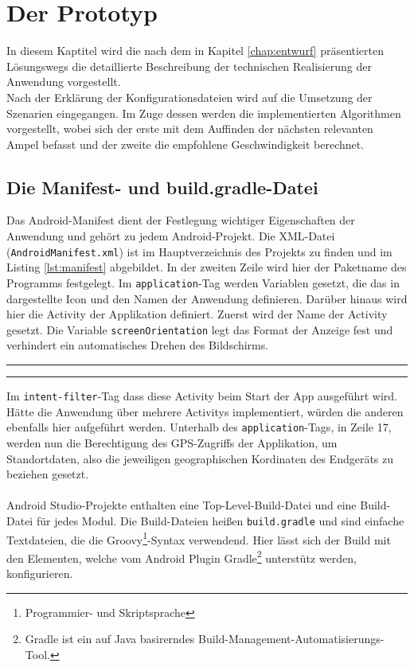 \chapter{\label{chap:implementierung}Der Prototyp}
In diesem Kaptitel wird die nach dem in Kapitel \ref{chap:entwurf} präsentierten Lösungswegs die detaillierte Beschreibung der technischen Realisierung der Anwendung vorgestellt.\\
Nach der Erklärung der Konfigurationsdateien wird auf die Umsetzung der Szenarien eingegangen. Im Zuge dessen werden die implementierten Algorithmen vorgestellt, wobei sich der erste mit dem Auffinden der nächsten relevanten Ampel befasst und der zweite die empfohlene Geschwindigkeit berechnet.
%
%
\section{Die Manifest- und build.gradle-Datei}
Das Android-Manifest dient der Festlegung wichtiger Eigenschaften der Anwendung und gehört zu jedem Android-Projekt. Die \gls{XML}-Datei (\texttt{AndroidManifest.xml}) ist im Hauptverzeichnis des Projekts zu finden und im Listing \ref{lst:manifest} abgebildet. In der zweiten Zeile wird hier der Paketname des Programms festgelegt. 
Im \texttt{application}-Tag werden Variablen gesetzt, die das in dargestellte Icon und den Namen der Anwendung definieren. Darüber hinaus wird hier die \gls{Activity} der Applikation definiert. Zuerst wird der Name der \gls{Activity} gesetzt. Die Variable \texttt{screenOrientation} legt das Format der Anzeige fest und verhindert ein automatisches Drehen des Bildschirms. 
\begin{center}
\rule{35em}{0.5pt} 
 \rule{35em}{0.5pt}
\end{center}
Im \texttt{intent-filter}-Tag dass diese Activity beim Start der App ausgeführt wird. Hätte die Anwendung über mehrere \glspl{Activity} implementiert, würden die anderen ebenfalls hier aufgeführt werden.
Unterhalb des \texttt{application}-Tags, in Zeile 17, werden nun die Berechtigung des \gls{GPS}-Zugriffs der Applikation, um Standortdaten, also die jeweiligen geographischen Kordinaten des Endgeräts zu beziehen gesetzt.\\\\
Android Studio-Projekte enthalten eine Top-Level-Build-Datei und eine Build-Datei für jedes Modul. Die Build-Dateien heißen \texttt{build.gradle} und sind einfache Textdateien, die die Groovy\footnote{ Programmier- und Skriptsprache}-Syntax verwendend. Hier lässt sich der Build mit den Elementen, welche vom Android Plugin Gradle\footnote{ Gradle ist ein auf Java basirerndes Build-Management-Automatisierungs-Tool.} unterstütz werden, konfigurieren. \cite{android_build} \\ 
